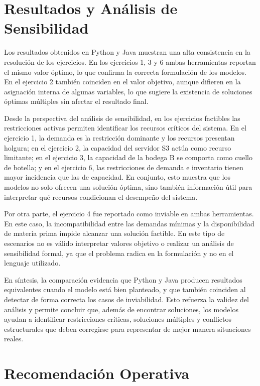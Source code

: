 \documentclass[12pt,letterpaper]{article}
\begin{document}
\section{Resultados y Análisis de Sensibilidad}

Los resultados obtenidos en Python y Java muestran una alta consistencia en la resolución de los ejercicios. En los ejercicios 1, 3 y 6 ambas herramientas reportan el mismo valor óptimo, lo que confirma la correcta formulación de los modelos. En el ejercicio 2 también coinciden en el valor objetivo, aunque difieren en la asignación interna de algunas variables, lo que sugiere la existencia de soluciones óptimas múltiples sin afectar el resultado final.

Desde la perspectiva del análisis de sensibilidad, en los ejercicios factibles las restricciones activas permiten identificar los recursos críticos del sistema. En el ejercicio 1, la demanda es la restricción dominante y los recursos presentan holgura; en el ejercicio 2, la capacidad del servidor S3 actúa como recurso limitante; en el ejercicio 3, la capacidad de la bodega B se comporta como cuello de botella; y en el ejercicio 6, las restricciones de demanda e inventario tienen mayor incidencia que las de capacidad. En conjunto, esto muestra que los modelos no solo ofrecen una solución óptima, sino también información útil para interpretar qué recursos condicionan el desempeño del sistema.

Por otra parte, el ejercicio 4 fue reportado como inviable en ambas herramientas. En este caso, la incompatibilidad entre las demandas mínimas y la disponibilidad de materia prima impide alcanzar una solución factible. En este tipo de escenarios no es válido interpretar valores objetivo o realizar un análisis de sensibilidad formal, ya que el problema radica en la formulación y no en el lenguaje utilizado.

En síntesis, la comparación evidencia que Python y Java producen resultados equivalentes cuando el modelo está bien planteado, y que también coinciden al detectar de forma correcta los casos de inviabilidad. Esto refuerza la validez del análisis y permite concluir que, además de encontrar soluciones, los modelos ayudan a identificar restricciones críticas, soluciones múltiples y conflictos estructurales que deben corregirse para representar de mejor manera situaciones reales.

\section{Recomendación Operativa}
\end{document}
